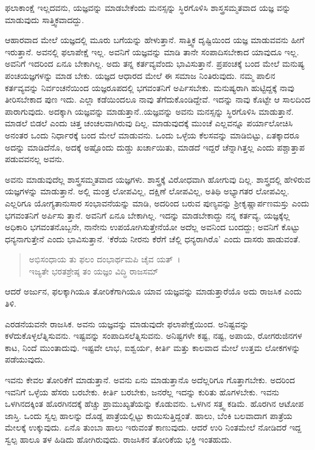 {\small ಫಲಾಕಾಂಕ್ಷೆ ಇಲ್ಲದವನು, ಯಜ್ಞವನ್ನು ಮಾಡಬೇಕೆಂದು ಮನಸ್ಸನ್ನು ಸ್ಥಿರಗೊಳಿಸಿ ಶಾಸ್ತ್ರಸಮ್ಮತವಾದ ಯಜ್ಞ ವನ್ನು ಮಾಡುವುದು ಸಾತ್ತ್ವಿಕವಾದದ್ದು.}

ಆಹಾರವಾದ ಮೇಲೆ ಯಜ್ಞದಲ್ಲಿ ಮೂರು ಬಗೆಯನ್ನು ಹೇಳುತ್ತಾನೆ. ಸಾತ್ತ್ವಿಕ ದೃಷ್ಟಿಯಿಂದ ಯಜ್ಞ ಮಾಡುವವನು ಹೀಗೆ ಇರುತ್ತಾನೆ. ಅವನಲ್ಲಿ ಫಲಾಪೇಕ್ಷೆ ಇಲ್ಲ. ಅವನಿಗೆ ಯಜ್ಞವನ್ನು ಮಾಡಿ ತಾನೇ ಸಂಪಾದಿಸಬೇಕಾದ ಯಾವುದೂ ಇಲ್ಲ. ಅವನಿಗೆ ಇದರಿಂದ ಏನೂ ಬೇಕಾಗಿಲ್ಲ. ಅದು ತನ್ನ ಕರ್ತವ್ಯವೆಂದು ಭಾವಿಸುತ್ತಾನೆ. ಪ್ರಪಂಚಕ್ಕೆ ಬಂದ ಮೇಲೆ ಮನುಷ್ಯ ಪಂಚಯಜ್ಞಗಳನ್ನು ಮಾಡ ಬೇಕು. ಯಜ್ಞದ ಆಧಾರದ ಮೇಲೆ ಈ ಸಮಾಜ ನಿಂತಿರುವುದು. ನಮ್ಮ ಪಾಲಿನ ಕರ್ತವ್ಯವನ್ನು ನಿರ್ವಂಚನೆಯಿಂದ ಯಜ್ಞರೂಪದಲ್ಲಿ ಭಗವಂತನಿಗೆ ಅರ್ಪಿಸಬೇಕು. ಮನುಷ್ಯರಾಗಿ ಹುಟ್ಟಿದ್ದಕ್ಕೆ ನಾವು ತೀರಿಸಬೇಕಾದ ಪುಣ ಇದು. ಎಲ್ಲಾ ಕಡೆಯಿಂದಲೂ ನಾವು ತೆಗೆದುಕೊಂಡಿದ್ದೇವೆ. ಇದನ್ನು ನಾವು ಕೊಟ್ಟೇ ಆ ಸಾಲದಿಂದ ಪಾರಾಗುವುದು. ಅದಕ್ಕಾಗಿ ಯಜ್ಞವನ್ನು ಮಾಡುತ್ತಾನೆ..ಯಜ್ಞವನ್ನು ಅವನು ಮನಸ್ಸನ್ನು ಸ್ಥಿರಗೊಳಿಸಿ ಮಾಡುತ್ತಾನೆ. ಮಾಡಲೆ ಬಿಡಲೆ ಎಂದು ಚಿತ್ತ ಚಂಚಲವಾಗಿರುವು ದಿಲ್ಲ. ಮಾಡುವುದಕ್ಕೆ ಮುಂಚೆ ಎಲ್ಲವನ್ನೂ ಪರ್ಯಾಲೋಚಿಸಿ ಅನಂತರ ಒಂದು ನಿರ್ಧಾರಕ್ಕೆ ಬಂದ ಮೇಲೆ ಮಾಡುವನು. ಒಂದು ಒಳ್ಳೆಯ ಕೆಲಸವನ್ನು ಮಾಡಿಬಿಟ್ಟು, ಏತಕ್ಕಾದರೂ ಅದನ್ನು ಮಾಡಿದೆನೊ, ಅದಕ್ಕೆ ಅಷ್ಟೊಂದು ದುಡ್ಡು ಖರ್ಚಾಯಿತು, ಮಾಡದೆ ಇದ್ದರೆ ಚೆನ್ನಾಗಿತ್ತಲ್ಲ ಎಂದು ಪಶ್ಚಾತ್ತಾಪ ಪಡುವವನಲ್ಲ ಅವನು.

ಅವನು ಮಾಡುವುದೆಲ್ಲ ಶಾಸ್ತ್ರಸಮ್ಮತವಾದ ಯಜ್ಞಗಳು. ಶಾಸ್ತ್ರಕ್ಕೆ ವಿರೋಧವಾಗಿ ಹೋಗುವು ದಿಲ್ಲ. ಶಾಸ್ತ್ರದಲ್ಲಿ ಹೇಳಿರುವ ಯಜ್ಞಗಳನ್ನು ಮಾಡುತ್ತಾನೆ. ಅಲ್ಲಿ ಮಂತ್ರ ಲೋಪವಿಲ್ಲ, ದಕ್ಷಿಣೆ ಲೋಪವಿಲ್ಲ, ಅತಿಥಿ ಅಭ್ಯಾಗತರ ಲೋಪವಿಲ್ಲ. ಎಲ್ಲರಿಗೂ ಯೋಗ್ಯತಾನುಸಾರ ಸಂಭಾವನೆಯನ್ನು ಮಾಡಿ, ಅದರಿಂದ ಬರುವ ಪುಣ್ಯವನ್ನು ಶ‍್ರೀಕೃಷ್ಣಾರ್ಪಣಮಸ್ತು ಎಂದು ಭಗವಂತನಿಗೆ ಅರ್ಪಿಸು ತ್ತಾನೆ. ಅವನಿಗೆ ಏನೂ ಬೇಕಾಗಿಲ್ಲ. ಇದನ್ನು ಮಾಡಬೇಕಾದ್ದು ನನ್ನ ಕರ್ತವ್ಯ, ಯಜ್ಞಕ್ಕೆಲ್ಲ ಅಧಿಕಾರಿ ಭಗವಂತನೊಬ್ಬನೇ, ನಾನೇನು ಉಪಯೋಗಿಸುತ್ತೇನೆಯೋ ಅದೆಲ್ಲ ಅವನಿಂದ ಬಂದದ್ದು; ಅವನಿಗೆ ಕೊಟ್ಟು ಧನ್ಯನಾಗುತ್ತೇನೆ ಎಂದು ಭಾವಿಸುತ್ತಾನೆ. ‘ಕೆರೆಯ ನೀರನು ಕೆರೆಗೆ ಚೆಲ್ಲಿ ಧನ್ಯರಾಗಿರೊ’ ಎಂದು ದಾಸರು ಹಾಡುವಂತೆ.

\begin{verse}
ಅಭಿಸಂಧಾಯ ತು ಫಲಂ ದಂಭಾರ್ಥಮಪಿ ಚೈವ ಯತ್~।\\ಇಜ್ಯತೇ ಭರತಶ್ರೇಷ್ಠ ತಂ ಯಜ್ಞಂ ವಿದ್ಧಿ ರಾಜಸಮ್ 
\end{verse}

{\small ಆದರೆ ಅರ್ಜುನ, ಫಲಕ್ಕಾಗಿಯೂ ತೋರಿಕೆಗಾಗಿಯೂ ಯಾವ ಯಜ್ಞವನ್ನು ಮಾಡುತ್ತಾರೆಯೊ ಅದು ರಾಜಸಿಕ ಎಂದು ತಿಳಿ.}

ಎರಡನೆಯವನೇ ರಾಜಸಿಕ. ಅವನು ಯಜ್ಞವನ್ನು ಮಾಡುವುದೇ ಫಲಾಪೇಕ್ಷೆಯಿಂದ. ಅನಿಷ್ಟವನ್ನು ಕಳೆದುಕೊಳ್ಳಲೆತ್ನಿಸುವನು. ಇಷ್ಟವನ್ನು ಸಂಪಾದಿಸಲೆತ್ನಿಸುವನು. ಅನಿಷ್ಟಗಳೇ ಕಷ್ಟ, ನಷ್ಟ, ಅಪಾಯ, ರೋಗರುಜಿನಗಳ ಕಾಟ, ನಿಂದೆ ಮುಂತಾದುವು. ಇಷ್ಟವೇ ಲಾಭ, ಐಶ್ವರ್ಯ, ಕೀರ್ತಿ ಮತ್ತು ಕಾಲವಾದ ಮೇಲೆ ಉತ್ತಮ ಲೋಕಗಳನ್ನು ಪಡೆಯುವುದು.

ಇವನು ಕೇವಲ ತೋರಿಕೆಗೆ ಮಾಡುತ್ತಾನೆ. ಅವನು ಏನು ಮಾಡುತ್ತಾನೊ ಅದೆಲ್ಲರಿಗೂ ಗೊತ್ತಾಗಬೇಕು. ಅದರಿಂದ ಇವನಿಗೆ ಒಳ್ಳೆಯ ಹೆಸರು ಬರಬೇಕು. ಕೀರ್ತಿ ಬರಬೇಕು, ಜನರೆಲ್ಲ ಇದನ್ನು ಕುರಿತು ಹೊಗಳಬೇಕು. ಇವನು ಒಳಗಿನದಕ್ಕಿಂತ ಹೊರಗಿನದಕ್ಕೆ ಹೆಚ್ಚು ಪ್ರಾಮುಖ್ಯತೆಯನ್ನು ಕೊಡುವನು. ಒಳಗಿನ ಸತ್ತ್ವ ಕಡಿಮೆ. ಹೊರಗಿನ ಆಟೋಪ ಜಾಸ್ತಿ. ಒಂದು ಸ್ವಲ್ಪ ಹಾಲನ್ನು ದೊಡ್ಡ ಪಾತ್ರೆಯಲ್ಲಿಟ್ಟು ಕಾಯಿಸುತ್ತಿದ್ದಂತೆ. ಹಾಲು, ಬೆಂಕಿ ಬಲವಾದಾಗ ಪಾತ್ರೆಯ ಮೇಲಕ್ಕೆ ಉಕ್ಕುವುದು. ಏನೊ ತುಂಬಾ ಹಾಲು ಇರುವಂತೆ ಕಾಣುವುದು. ಆದರೆ ಉರಿ ನಿಂತಮೇಲೆ ನೋಡಿದರೆ ಇದ್ದ ಸ್ವಲ್ಪ ಹಾಲೂ ತಳ ಹಿಡಿದು ಹೋಗಿರುವುದು. ರಾಜಸಿಕನ ತೋರಿಕೆಯ ಭಕ್ತಿ ಇಂತಹುದು.


